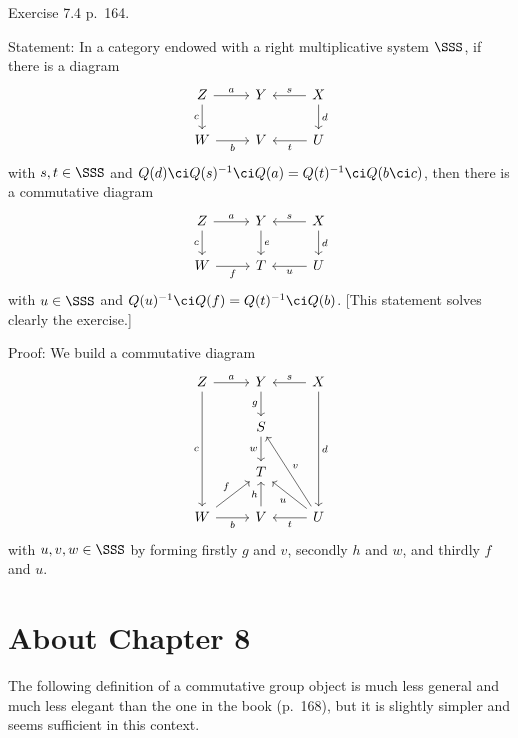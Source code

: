 \documentclass[12pt]{article}
\theoremstyle{remark}
\theoremstyle{definition}
\begin{document}
%

\begin{s} 
Exercise 7.4 p.~164. 

Statement: In a category endowed with a right multiplicative system $\SSS$, if there is a diagram 
$$
\begin{tikzcd}
Z\ar[d,"c"']\ar[r,"a"]&Y&X\ar[l,"s"']\ar[d,"d"]\\ 
W\ar[r,"b"']&V&U\ar[l,"t"]
\end{tikzcd}
$$ 
with $s,t\in\SSS$ and $Q(d)\ci Q(s)^{-1}\ci Q(a)=Q(t)^{-1}\ci Q(b\ci c)$, then there is a commutative diagram 
$$
\begin{tikzcd}
Z\ar[d,"c"']\ar[r,"a"]&Y\ar[d,"e"]&X\ar[l,"s"']\ar[d,"d"]\\ 
W\ar[r,"f"']&T&U\ar[l,"u"]
\end{tikzcd}
$$ 
with $u\in\SSS$ and $Q(u)^{-1}\ci Q(f)=Q(t)^{-1}\ci Q(b)$. [This statement solves clearly the exercise.]

Proof: We build a commutative diagram 
$$
\begin{tikzcd}
Z\ar[ddd,"c"']\ar[r,"a"]&Y\ar[d,"g"']&X\ar[l,"s"']\ar[ddd,"d"]\\ 
&S\ar[d,"w"']\\ 
&T\\ 
W\ar[ur,"f"]\ar[r,"b"']&V\ar[u,"h"]&U\ar[l,"t"]\ar[ul,"u"]\ar[uul,"v"']
\end{tikzcd}
$$ 
with $u,v,w\in\SSS$ by forming firstly $g$ and $v$, secondly $h$ and $w$, and thirdly $f$ and $u$. 
\end{s} 


\section{About Chapter 8} 


The following definition of a commutative group object is much less general and much less elegant than the one in the book (p.~168), but it is slightly simpler and seems sufficient in this context. 
\end{document}
